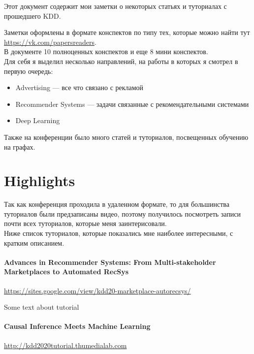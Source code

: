 Этот документ содержит мои заметки о некоторых статьях и туториалах с прошедшего KDD.

Заметки оформлены в формате конспектов по типу тех, которые можно найти тут \url{https://vk.com/papersreaders}. \\

В документе 10 полноценных конспектов и еще 8 мини конспектов. \\

Для себя я выделил несколько направлений, на работы в которых я смотрел в первую очередь:
\begin{itemize}
    \item Advertising --- все что связано с рекламой
    \item Recommender Systems --- задачи связанные с рекомендательными системами
    \item Deep Learning
\end{itemize}

Также на конференции было много статей и туториалов, посвещенных обучению на графах.

\section*{Highlights}

Так как конференция проходила в удаленном формате, то для большинства туториалов были предзаписаны видео, поэтому получилось посмотреть записи почти всех туториалов, которые меня заинтерисовали. \\

Ниже список туториалов, которые показались мне наиболее интересными, с кратким описанием.

\paragraph{Advances in Recommender Systems: From Multi-stakeholder Marketplaces to Automated RecSys} $ $\\

\url{https://sites.google.com/view/kdd20-marketplace-autorecsys/}

Some text about tutorial

\paragraph{Causal Inference Meets Machine Learning} $ $\\

\url{http://kdd2020tutorial.thumedialab.com}

